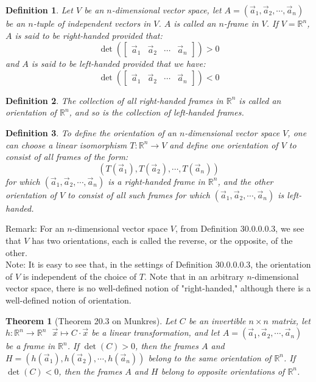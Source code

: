 \documentclass[15pt]{book}
\theoremstyle{break}
\theoremstyle{break}
\newtheorem{thm}{Theorem}[section]
\newtheorem{defn}{Definition}[corL]
\newcommand{\R}{\mathbb{R}}
\newcommand{\bmat}[1]{\begin{bmatrix} #1 \end{bmatrix}}
\newcommand{\note}{\color{red}Note: \color{black}}
\newcommand{\remark}{\color{blue}Remark: \color{black}}
\begin{document}
\begin{defn}
Let $V$ be an $n$-dimensional vector space, let $A = (\vec{a}_1,\vec{a}_2,\cdots, \vec{a}_n)$ be an $n$-tuple of independent vectors in $V$. $A$ is called an $n$-frame in $V$. If $V = \R^n$, $A$ is said to be right-handed provided that:
$$\det\left(\bmat{\vec{a}_1 & \vec{a}_2 & \cdots & \vec{a}_n}\right) > 0$$ 
and $A$ is said to be left-handed provided that we have: 
$$\det\left(\bmat{\vec{a}_1 & \vec{a}_2 & \cdots & \vec{a}_n}\right) < 0$$
\end{defn}

\begin{defn}
The collection of all right-handed frames in $\R^n$ is called an orientation of $\R^n$, and so is the collection of left-handed frames. 
\end{defn}

\begin{defn}
To define the orientation of an $n$-dimensional vector space $V$, one can choose a linear isomorphism $T:\R^n \to V$ and define one orientation of $V$ to consist of all frames of the form: $$(T(\vec{a}_1), T(\vec{a}_2),\cdots, T(\vec{a}_n))$$ 
for which $(\vec{a}_1,\vec{a}_2,\cdots, \vec{a}_n)$ is a right-handed frame in $\R^n$, and the other orientation of $V$ to consist of all such frames for which $(\vec{a}_1, \vec{a}_2,\cdots, \vec{a}_n)$ is left-handed.
\end{defn}

\remark For an $n$-dimensional vector space $V$, from Definition 30.0.0.0.3, we see that $V$ has two orientations, each is called the reverse, or the opposite, of the other. \\

\note It is easy to see that, in the settings of Definition 30.0.0.0.3, the orientation of $V$ is independent of the choice of $T$. Note that in an arbitrary $n$-dimensional vector space, there is no well-defined notion of "right-handed," although there is a well-defined notion of orientation.

\begin{thm}[Theorem 20.3 on Munkres]
Let $C$ be an invertible $n\times n$ matrix, let $h:\R^n \to \R^n \ \ \ \vec{x}\mapsto C\cdot \vec{x}$ be a linear transformation, and let $A=(\vec{a}_1,\vec{a}_2,\cdots, \vec{a}_n)$ be a frame in $\R^n$. If $\det(C) >0$, then the frames $A$ and $H=(h(\vec{a}_1),h(\vec{a}_2),\cdots, h(\vec{a}_n))$ belong to the same orientation of $\R^n$. If $\det(C)<0$, then the frames $A$ and $H$ belong to opposite orientations of $\R^n$.
\end{thm}
\end{document}
